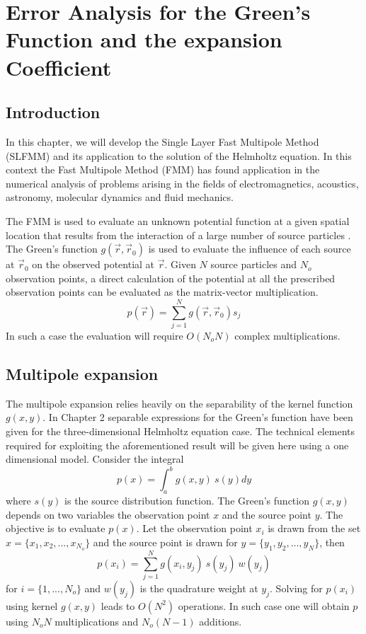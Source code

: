 \chapter{Error Analysis for the Green's Function and the expansion Coefficient }
\label{intro1}
\section{Introduction}
In this chapter, we will develop the 
Single Layer Fast Multipole Method (SLFMM)
and its application to the solution of 
the Helmholtz equation.
In this context the Fast Multipole Method (FMM) has found application in the numerical analysis of 
problems arising in the fields of electromagnetics, acoustics, astronomy, 
molecular dynamics and fluid mechanics\cite{beatson1997short,coifman1993fast,anderson1992implementation}. 
 
The  FMM is used to evaluate an unknown potential function at a given spatial location that results from the interaction of a large number of source
particles \cite{chartier2010regular}. 
The Green's function $ g( \vec{r},\vec{r}_0 )$ is used to evaluate the influence of each 
source at $\vec{r}_0$ on the observed potential at $\vec{r}$.
Given $N$ source particles and $N_o$ observation points, 
a direct calculation of the potential at all the prescribed 
observation points can be evaluated as the matrix-vector multiplication.
\begin{equation}
p(\vec{r}) = \sum_{j=1}^N  g( \vec{r},\vec{r}_0 )s_j \nonumber
\end{equation}
In such a case the evaluation will require $O( N_o N )$ complex multiplications. 

\section{Multipole expansion}\label{multiEx1}
The multipole expansion relies heavily on the separability of the
kernel function $g(x,y)$. In Chapter 2 separable expressions for the Green's function
have been given for the three-dimensional Helmholtz equation case.
The technical elements required for exploiting the aforementioned result will be given here using a one dimensional model.
Consider the integral 
\begin{equation}\label{first2chap}
p(x)=\int_a^b g(x,y)~s(y)dy
\end{equation} 
where $s(y)$ is the source distribution function.
The Green's function $g(x,y)$ depends on two variables the 
observation point $x$ and the source point $y$. 
The objective is to evaluate $p(x)$.
Let the observation point $x_i$ is drawn 
from the set
$x = \{x_1,x_2, ...,x_{N_o}\}$ and the source point 
is drawn for $y = \{y_1,y_2,...,y_N\} $, then
\begin{equation}
\label{chap3/0.21}
p(x_i)=\sum_{j=1}^{N} g(x_i,y_j)~s(y_j)~w( y_j)
\end{equation} 
for $i=\{1,...,N_o\}$ and
$w( y_j )$ is the quadrature weight at $y_j$.
Solving for $p(x_i)$ using kernel $g(x,y)$ leads to $O(N^2)$ operations.
In such case one will obtain $p$ using $N_o N$ multiplications and $N_o (N-1)$ additions.

